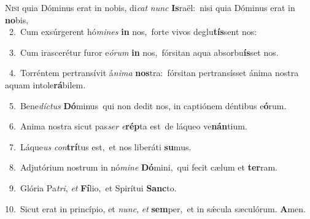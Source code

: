 \lettrine{\initial\textcolor{\initialcolor}{N}}{isi} quia Dóminus erat in nobis, di\textit{cat} \textit{nunc} \textbf{Is}\-raël:~\star nisi quia Dóminus erat in \textbf{no}\-bis,\\
{\numbfont\textcolor{\numbcolor}{~2.}}~Cum exsúrgerent hó\-\textit{mi}\-\textit{nes} \textbf{in} nos,~\star forte vivos deglu\-\textbf{tís}\-sent nos:\par
{\numbfont\textcolor{\numbcolor}{~3.}}~Cum irascerétur furor e\-\textit{ó}\-\textit{rum} \textbf{in} nos,~\star fórsitan aqua absorbu\-\textbf{ís}\-set nos.\par
{\numbfont\textcolor{\numbcolor}{~4.}}~Torréntem pertransívit á\-\textit{ni}\-\textit{ma} \textbf{nos}\-tra:~\star fórsitan pertransísset ánima nostra aquam intole\-\textbf{rá}\-bilem.\par
{\numbfont\textcolor{\numbcolor}{~5.}}~Bene\-\textit{díc}\-\textit{tus} \textbf{Dó}\-minus~\star qui non dedit nos, in captiónem déntibus e\-\textbf{ó}\-rum.\par
{\numbfont\textcolor{\numbcolor}{~6.}}~Anima nostra sicut pas\textit{ser} \textit{e}\-\textbf{rép}ta est~\star de láqueo ve\-\textbf{nán}\-tium.\par
{\numbfont\textcolor{\numbcolor}{~7.}}~Láque\textit{us} \textit{con}\-\textbf{trí}tus est,~\star et nos liberáti \textbf{su}\-mus.\par
{\numbfont\textcolor{\numbcolor}{~8.}}~Adjutórium nostrum in nó\-\textit{mi}\-\textit{ne} \textbf{Dó}\-mini,~\star qui fecit cælum et \textbf{ter}\-ram.\par
{\numbfont\textcolor{\numbcolor}{~9.}}~Glória Pa\-\textit{tri}\-, \textit{et} \textbf{Fí}\-lio,~\star et Spirítui \textbf{Sanc}\-to.\par
{\numbfont\textcolor{\numbcolor}{10.}}~Sicut erat in princípio, et \textit{nunc}\-, \textit{et} \textbf{sem}\-per,~\star et in sǽcula sæculórum. \textbf{A}\-men.\par
